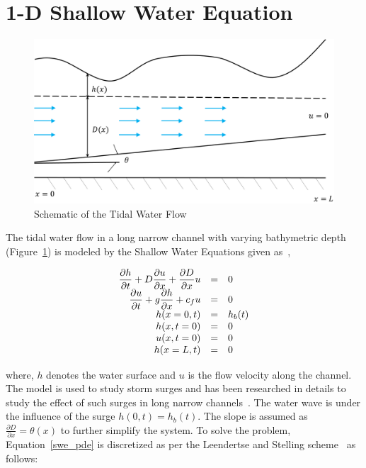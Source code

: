 \section{1-D Shallow Water Equation}
\label{shallow_water}

\begin{figure}[H]
\centering
\includegraphics[scale=0.2]{figures_2/swe}
\caption{Schematic of the Tidal Water Flow}
\label{swe}
\end{figure}

The tidal water flow in a long narrow channel with varying bathymetric depth (Figure~\ref{swe}) is modeled by the Shallow Water Equations given as~\cite{verlaan1998cient}, 

\begin{equation}
\label{swe_pde}
\begin{array}{r c l}
\displaystyle \frac{\partial h}{\partial t} + D \frac{\partial u}{\partial x} + \frac{\partial D}{\partial x} u & =  & 0 \\
\displaystyle \frac{\partial u}{\partial t} + g \frac{\partial h}{\partial x} + c_f u & =  & 0 \\
h(x = 0,t) & = & h_b(t) \\
h(x ,t = 0) & = & 0 \\
u(x ,t = 0) & = & 0 \\
h(x = L ,t) & = & 0 \\
\end{array}
\end{equation}

\noindent where, $h$ denotes the water surface and $u$ is the flow velocity along the channel. The model is used to study storm surges and has been researched in details to study the effect of such surges in long narrow channels~\cite{verlaan1998cient}. The water wave is under the influence of the surge $h(0,t) = h_b(t)$. The slope is assumed as $\frac{\partial D}{\partial x} = \theta(x)$ to further simplify the system. To solve the problem, Equation~\ref{swe_pde} is discretized as per the Leendertse and Stelling scheme~\cite{verlaan1998cient,leendertse1967aspects,stelling1983construction,wesseling2009principles} as follows:

